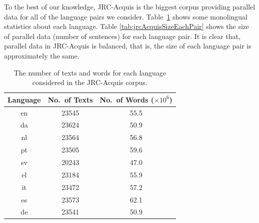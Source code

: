 To the best of our knowledge, JRC-Acquis is the biggest corpus providing parallel data for all of the language pairs we consider. Table~\ref{tab:acquis} shows some monolingual statistics about each language. Table \ref{tab:jrcAcquisSizeEachPair} shows the size of parallel data (number of sentences) for each language pair. It is clear that, parallel data in JRC-Acquis is balanced, that is, the size of each language pair is approximately the same. 
\begin{table}
\small
\centering
    \begin{tabular}{ccc}
    Language & No.\ of Texts & No.\ of Words ($\times 10^6$) \\
    \hline
    en       & 23545       & 55.5     \\
    da       & 23624       & 50.9     \\
    nl       & 23564       & 56.8     \\
    pt       & 23505       & 59.6     \\
    sv       & 20243       & 47.0     \\
    el       & 23184       & 55.9     \\
    it       & 23472       & 57.2     \\
    es       & 23573       & 62.1     \\
    de       & 23541       & 50.9     \\
    \end{tabular}
    \caption{The number of texts and words for each language considered in the JRC-Acquis corpus.}
    \label{tab:acquis}
\end{table}


